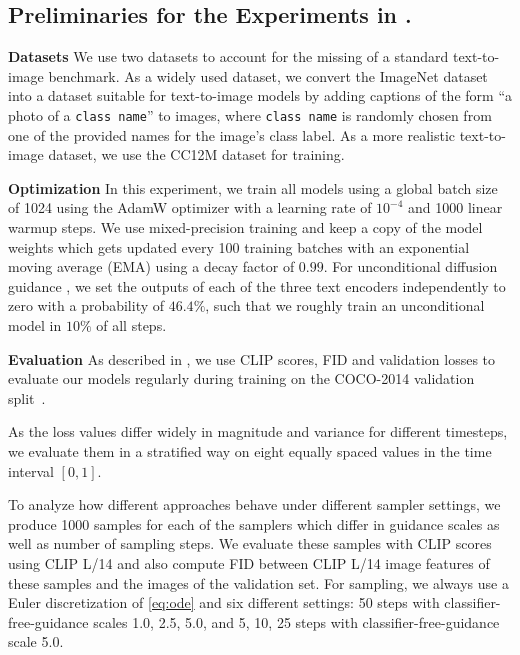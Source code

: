 \subsection{Preliminaries for the Experiments in .}
\label{subsubsec:exp_prelim}
%
%
%
%
%
%
%
%
%
%
%

\textbf{Datasets}
We use two datasets to account for the missing of a standard text-to-image
benchmark. As a widely used dataset, we convert the ImageNet dataset \cite{Russakovsky2014ImageNetLS}
into a dataset suitable for text-to-image models by adding captions of the
form ``a photo of a \texttt{\textlangle{}class name\textrangle{}}'' to images, where \texttt{\textlangle{}class name\textrangle{}} is randomly
chosen from one of the provided names for the image's class label.
%
As a more realistic text-to-image dataset, we use the CC12M dataset \cite{Changpinyo2021Conceptual1P} for
training.

\textbf{Optimization}
In this experiment, we train all models using a global batch size of 1024 using the AdamW optimizer
\cite{Loshchilov2017FixingWD} with a learning rate of $10^{-4}$ and 1000 linear warmup
steps. We use mixed-precision training and keep a copy of the model weights
which gets updated every 100 training batches with an exponential moving
average (EMA) using a decay factor of $0.99$. For unconditional diffusion
guidance \cite{ho2022classifierfree}, we set the outputs of each of the three text encoders
independently to zero with a probability of $46.4\%$, such that we roughly
train an unconditional model in $10\%$ of all steps.

\textbf{Evaluation}
%
%
%
%
%
%
As described in , we use CLIP scores, 
FID and validation losses to evaluate our models 
regularly during training on the COCO-2014 validation split~\cite{Lin_2014}.

As the loss values differ widely in magnitude and variance for different
timesteps, we evaluate them in a stratified way on eight equally spaced values
in the time interval $[0, 1]$.

To analyze how different approaches behave under different sampler settings, we
produce 1000 samples for each of the samplers which differ in guidance scales
as well as number of sampling steps. We evaluate these samples with CLIP scores
using CLIP L/14 \cite{radford2021learning} and also compute FID between CLIP L/14 image features of these
samples and the images of the validation set. For sampling, we always use a
Euler discretization \cite{euler1768institutionum} of \eqref{eq:ode} and six
different settings: 50 steps with classifier-free-guidance scales 1.0, 2.5,
5.0, and 5, 10, 25 steps with classifier-free-guidance scale 5.0.

